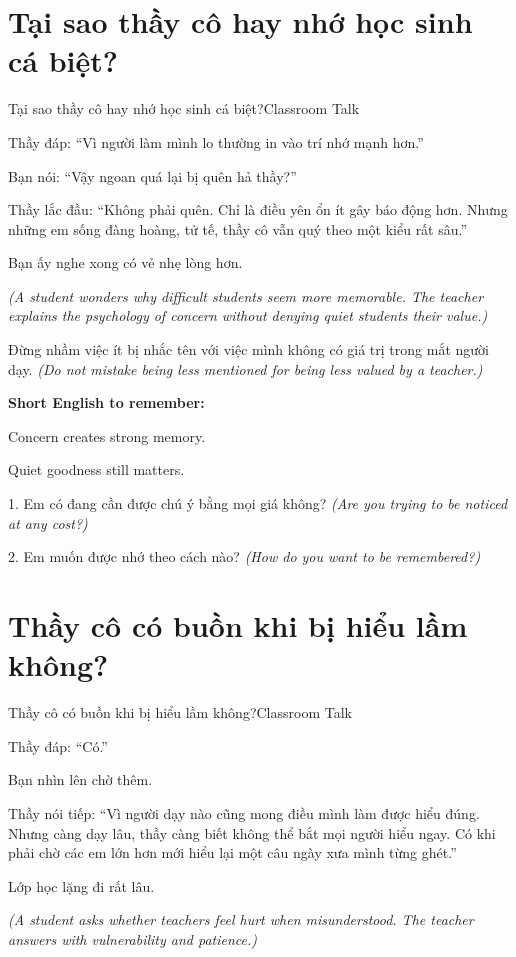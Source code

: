 \section{Tại sao thầy cô hay nhớ học sinh cá biệt?}
\begin{truyen}{Tại sao thầy cô hay nhớ học sinh cá biệt?}{Classroom Talk}

Thầy đáp: ``Vì người làm mình lo thường in vào trí nhớ mạnh hơn.''

Bạn nói: ``Vậy ngoan quá lại bị quên hả thầy?''

Thầy lắc đầu: ``Không phải quên. Chỉ là điều yên ổn ít gây báo động hơn. Nhưng những em sống đàng hoàng, tử tế, thầy cô vẫn quý theo một kiểu rất sâu.''

Bạn ấy nghe xong có vẻ nhẹ lòng hơn.

\textit{(A student wonders why difficult students seem more memorable. The teacher explains the psychology of concern without denying quiet students their value.)}
\end{truyen}

\begin{baihoc}
Đừng nhầm việc ít bị nhắc tên với việc mình không có giá trị trong mắt người dạy.
\textit{(Do not mistake being less mentioned for being less valued by a teacher.)}
\end{baihoc}

\begin{ghinhoanh}
\textbf{Short English to remember:}

Concern creates strong memory.

Quiet goodness still matters.
\end{ghinhoanh}

\begin{tuhocnhanh}
1. Em có đang cần được chú ý bằng mọi giá không? \textit{(Are you trying to be noticed at any cost?)}

2. Em muốn được nhớ theo cách nào? \textit{(How do you want to be remembered?)}
\end{tuhocnhanh}
\ngancach

\section{Thầy cô có buồn khi bị hiểu lầm không?}
\begin{truyen}{Thầy cô có buồn khi bị hiểu lầm không?}{Classroom Talk}

Thầy đáp: ``Có.''

Bạn nhìn lên chờ thêm.

Thầy nói tiếp: ``Vì người dạy nào cũng mong điều mình làm được hiểu đúng. Nhưng càng dạy lâu, thầy càng biết không thể bắt mọi người hiểu ngay. Có khi phải chờ các em lớn hơn mới hiểu lại một câu ngày xưa mình từng ghét.''

Lớp học lặng đi rất lâu.

\textit{(A student asks whether teachers feel hurt when misunderstood. The teacher answers with vulnerability and patience.)}
\end{truyen}

